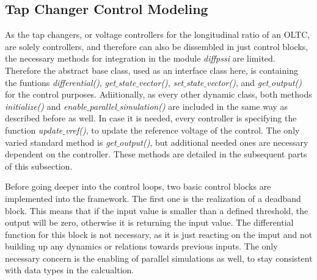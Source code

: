 

\subsection{Tap Changer Control Modeling}
\label{sec:modeling-tap-changer-control}

As the tap changers, or voltage controllers for the longitudinal ratio of an \acs{OLTC}, are solely controllers, and therefore can also be dissembled in just control blocks, the necessary methods for integration in the module \textit{diffpssi} are limited.
Therefore the abstract base class, used as an interface class here, is containing the funtions \textit{differential()}, \textit{get$\_$state$\_$vector()}, \textit{set$\_$state$\_$vector()}, and \textit{get$\_$output()} for the control purposes.
Adiitionally, as every other dynamic class, both methods \textit{initialize()} and \textit{enable$\_$parallel$\_$simulation()} are included in the same way as described before as well.
In case it is needed, every controller is specifying the function \textit{update$\_$vref()}, to update the reference voltage of the control. 
The only varied standard method is \textit{get$\_$output()}, but additional needed ones are necessary dependent on the controller.
These methods are detailed in the subsequent parts of this subsection.

Before going deeper into the control loops, two basic control blocks are implemented into the framework.
The first one is the realization of a deadband block.
This means that if the input value is smaller than a defined threshold, the output will be zero, otherwise it is returning the input value.
The differential function for this block is not necessary, as it is just reacting on the imput and not building up any dynamics or relations towards previous inputs.
The only necessary concern is the enabling of parallel simulations as well, to stay consistent with data types in the calcualtion.


